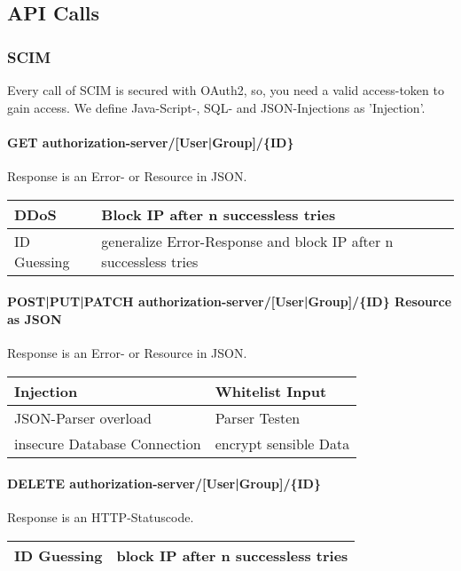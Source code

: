 \subsection{API Calls}
\subsubsection{SCIM}
Every call of SCIM is secured with OAuth2, so, you need a valid access-token to gain access. We define Java-Script-, SQL- and JSON-Injections as 'Injection'.

\paragraph{GET authorization-server/[User|Group]/\{ID\}}

Response is an Error- or Resource in JSON.

\begin{tabular}{|l|l|}
    \hline
    DDoS & Block IP after n successless tries\\
    \hline
    ID Guessing & generalize Error-Response and block IP after n successless tries\\

    \hline
 \end{tabular}

\paragraph{POST|PUT|PATCH authorization-server/[User|Group]/\{ID\} Resource as JSON} 

Response is an Error- or Resource in JSON. 
\begin{tabular}{|l|l|}
    \hline
    Injection & Whitelist Input\\
    \hline
    JSON-Parser overload & Parser Testen \\
    \hline
    insecure Database Connection & encrypt sensible Data \\
    \hline
 \end{tabular}

\paragraph{DELETE authorization-server/[User|Group]/\{ID\}}

Response is an HTTP-Statuscode.

\begin{tabular}{|l|l|}
   \hline
    ID Guessing & block IP after n successless tries\\
    \hline
 \end{tabular}


